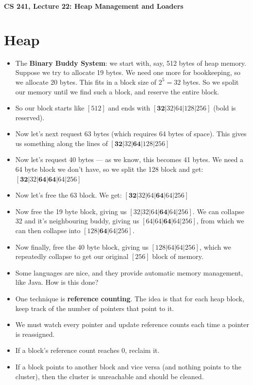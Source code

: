 \documentclass[12pt]{article}
\author{Clement Tsang}
\begin{document}
\begin{center}
\Large\textbf{CS 241, Lecture 22: Heap Management and Loaders}
\end{center}

\section{Heap}
\begin{itemize}
    \item The \textbf{Binary Buddy System}: we start with, say, 512 bytes of heap memory.  Suppose we try to allocate 19 bytes.  We need one more for bookkeeping, so we allocate 20 bytes.  This fits in a block size of $2^5 = 32$ bytes.  So we spolit our memory until we find such a block, and reserve the entire block.
    \item So our block starts like $[512]$ and ends with $[\textbf{32}|32|64|128|256]$ (bold is reserved).  
    \item Now let's next request 63 bytes (which requires 64 bytes of space).  This gives us something along the lines of $[\textbf{32}|32|\textbf{64}|128|256]$ 
    \item Now let's request 40 bytes --- as we know, this becomes 41 bytes.  We need a 64 byte block we don't have, so we split the 128 block and get: $[\textbf{32}|32|\textbf{64}|\textbf{64}|64|256]$ 
    \item Now let's free the 63 block.  We get: $[\textbf{32}|32|64|\textbf{64}|64|256]$ 
    \item Now free the 19 byte block, giving us $[32|32|64|\textbf{64}|64|256]$.  We can collapse 32 and it's neighbouring buddy, giving us $[64|64|\textbf{64}|64|256]$, from which we can then collapse into $[128|\textbf{64}|64|256]$.
    \item Now finally, free the 40 byte block, giving us $[128|64|64|256]$, which we repeatedly collapse to get our original $[256]$ block of memory.
    \item Some languages are nice, and they provide automatic memory management, like Java.  How is this done?
    \item One technique is \textbf{reference counting}.  The idea is that for each heap block, keep track of the number of pointers that point to it.
    \item We must watch every pointer and update reference counts each time a pointer is reassigned.
    \item If a block's reference count reaches 0, reclaim it.
    \item If a block points to another block and vice versa (and nothing points to the cluster), then the cluster is unreachable and should be cleaned.

\end{itemize}
\end{document}

